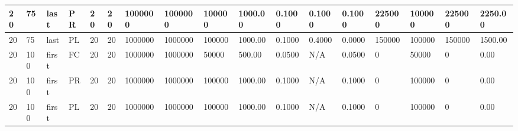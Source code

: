 \begin{tabular}{|l|l|l|l|l|l|l|l|l|l|l|l|l|l|l|l|l|}
20 & 75 & last & PR & 20 & 20 & 1000000 & 1000000 & 100000 & 1000.00 & 0.1000 & 0.1000 & 0.1000 & 225000 & 100000 & 225000 & 2250.00 \\ \hline
20 & 75 & last & PL & 20 & 20 & 1000000 & 1000000 & 100000 & 1000.00 & 0.1000 & 0.4000 & 0.0000 & 150000 & 100000 & 150000 & 1500.00 \\ \hline
20 & 100 & first & FC & 20 & 20 & 1000000 & 1000000 & 50000 & 500.00 & 0.0500 & N/A & 0.0500 & 0 & 50000 & 0 & 0.00 \\ \hline
20 & 100 & first & PR & 20 & 20 & 1000000 & 1000000 & 100000 & 1000.00 & 0.1000 & N/A & 0.1000 & 0 & 100000 & 0 & 0.00 \\ \hline
20 & 100 & first & PL & 20 & 20 & 1000000 & 1000000 & 100000 & 1000.00 & 0.1000 & N/A & 0.1000 & 0 & 100000 & 0 & 0.00 \\ \hline
\end{tabular}
